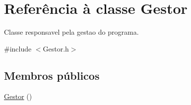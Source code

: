\hypertarget{class_gestor}{\section{Referência à classe Gestor}
\label{class_gestor}
}


Classe responsavel pela gestao do programa.  




{\ttfamily \#include $<$Gestor.\-h$>$}

\subsection*{Membros públicos}
\begin{DoxyCompactItemize}
\item 
\hypertarget{class_gestor_a63ab3a451dcedb416578c35b5d57aca4}{\hyperlink{class_gestor_a63ab3a451dcedb416578c35b5d57aca4}{Gestor} ()}\label{class_gestor_a63ab3a451dcedb416578c35b5d57aca4}


\end{DoxyCompactItemize}
